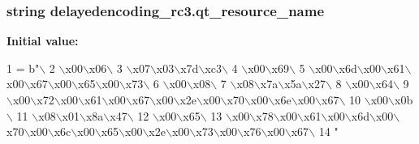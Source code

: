 \subsubsection[{qt\+\_\+resource\+\_\+name}]{\setlength{\rightskip}{0pt plus 5cm}string delayedencoding\+\_\+rc3.\+qt\+\_\+resource\+\_\+name}\label{namespacedelayedencoding__rc3_a85772392f26d8bda8c645b937df7b67f}
{\bfseries Initial value\+:}
\begin{DoxyCode}
1 = b\textcolor{stringliteral}{"\(\backslash\)}
2 \textcolor{stringliteral}{\(\backslash\)x00\(\backslash\)x06\(\backslash\)}
3 \textcolor{stringliteral}{\(\backslash\)x07\(\backslash\)x03\(\backslash\)x7d\(\backslash\)xc3\(\backslash\)}
4 \textcolor{stringliteral}{\(\backslash\)x00\(\backslash\)x69\(\backslash\)}
5 \textcolor{stringliteral}{\(\backslash\)x00\(\backslash\)x6d\(\backslash\)x00\(\backslash\)x61\(\backslash\)x00\(\backslash\)x67\(\backslash\)x00\(\backslash\)x65\(\backslash\)x00\(\backslash\)x73\(\backslash\)}
6 \textcolor{stringliteral}{\(\backslash\)x00\(\backslash\)x08\(\backslash\)}
7 \textcolor{stringliteral}{\(\backslash\)x08\(\backslash\)x7a\(\backslash\)x5a\(\backslash\)x27\(\backslash\)}
8 \textcolor{stringliteral}{\(\backslash\)x00\(\backslash\)x64\(\backslash\)}
9 \textcolor{stringliteral}{\(\backslash\)x00\(\backslash\)x72\(\backslash\)x00\(\backslash\)x61\(\backslash\)x00\(\backslash\)x67\(\backslash\)x00\(\backslash\)x2e\(\backslash\)x00\(\backslash\)x70\(\backslash\)x00\(\backslash\)x6e\(\backslash\)x00\(\backslash\)x67\(\backslash\)}
10 \textcolor{stringliteral}{\(\backslash\)x00\(\backslash\)x0b\(\backslash\)}
11 \textcolor{stringliteral}{\(\backslash\)x08\(\backslash\)x01\(\backslash\)x8a\(\backslash\)x47\(\backslash\)}
12 \textcolor{stringliteral}{\(\backslash\)x00\(\backslash\)x65\(\backslash\)}
13 \textcolor{stringliteral}{\(\backslash\)x00\(\backslash\)x78\(\backslash\)x00\(\backslash\)x61\(\backslash\)x00\(\backslash\)x6d\(\backslash\)x00\(\backslash\)x70\(\backslash\)x00\(\backslash\)x6c\(\backslash\)x00\(\backslash\)x65\(\backslash\)x00\(\backslash\)x2e\(\backslash\)x00\(\backslash\)x73\(\backslash\)x00\(\backslash\)x76\(\backslash\)x00\(\backslash\)x67\(\backslash\)}
14 \textcolor{stringliteral}{"}
\end{DoxyCode}
\hypertarget{namespacedelayedencoding__rc3_ac14be1465c69d6025a39f1b855f90fa9}{}
